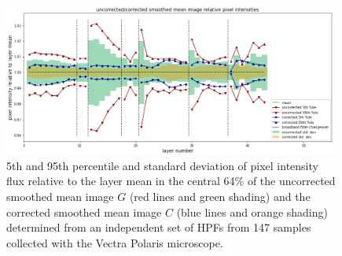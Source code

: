 \documentclass[letterpaper,11pt]{article}
\begin{document}
\begin{figure}[!ht]
\centering
\includegraphics[width=0.98\textwidth]{images/results/illumination_variation_reduction_polaris}
\caption{\footnotesize 5th and 95th percentile and standard deviation of pixel intensity flux relative to the layer mean in the central 64\% of the uncorrected smoothed mean image $G$ (red lines and green shading) and the corrected smoothed mean image $C$ (blue lines and orange shading) determined from an independent set of HPFs from 147 samples collected with the Vectra Polaris microscope.}
\label{fig:illumination_variation_reduction_polaris}
\end{figure} 
\end{document}
